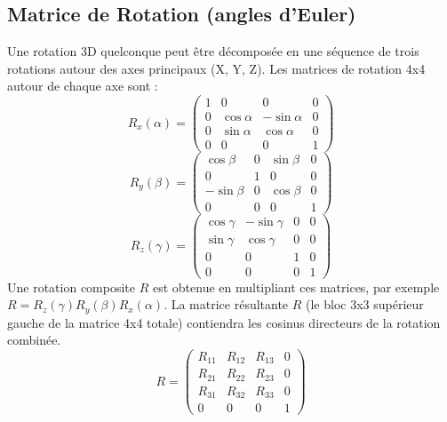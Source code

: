\documentclass{article}
\begin{document}
\subsection{Matrice de Rotation (angles d'Euler)}
Une rotation 3D quelconque peut être décomposée en une séquence de trois rotations autour des axes principaux (X, Y, Z). Les matrices de rotation 4x4 autour de chaque axe sont :
\[ R_x(\alpha) = \begin{pmatrix} 1 & 0 & 0 & 0 \\ 0 & \cos \alpha & -\sin \alpha & 0 \\ 0 & \sin \alpha & \cos \alpha & 0 \\ 0 & 0 & 0 & 1 \end{pmatrix} \]
\[ R_y(\beta) = \begin{pmatrix} \cos \beta & 0 & \sin \beta & 0 \\ 0 & 1 & 0 & 0 \\ -\sin \beta & 0 & \cos \beta & 0 \\ 0 & 0 & 0 & 1 \end{pmatrix} \]
\[ R_z(\gamma) = \begin{pmatrix} \cos \gamma & -\sin \gamma & 0 & 0 \\ \sin \gamma & \cos \gamma & 0 & 0 \\ 0 & 0 & 1 & 0 \\ 0 & 0 & 0 & 1 \end{pmatrix} \]
Une rotation composite $R$ est obtenue en multipliant ces matrices, par exemple $R = R_z(\gamma) R_y(\beta) R_x(\alpha)$. La matrice résultante $R$ (le bloc 3x3 supérieur gauche de la matrice 4x4 totale) contiendra les cosinus directeurs de la rotation combinée.
\[ R = \begin{pmatrix} R_{11} & R_{12} & R_{13} & 0 \\ R_{21} & R_{22} & R_{23} & 0 \\ R_{31} & R_{32} & R_{33} & 0 \\ 0 & 0 & 0 & 1 \end{pmatrix} \]
\end{document}
